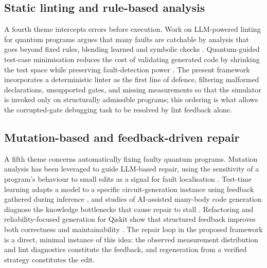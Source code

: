 \documentclass[11pt,a4paper]{article}
\begin{document}
\subsection{Static linting and rule-based analysis}
A fourth theme intercepts errors before execution. Work on LLM-powered linting for quantum programs argues that many faults are catchable by analysis that goes beyond fixed rules, blending learned and symbolic checks \cite{ref7}. Quantum-guided test-case minimisation reduces the cost of validating generated code by shrinking the test space while preserving fault-detection power \cite{ref17}. The present framework incorporates a deterministic linter as the first line of defence, filtering malformed declarations, unsupported gates, and missing measurements so that the simulator is invoked only on structurally admissible programs; this ordering is what allows the corrupted-gate debugging task to be resolved by lint feedback alone.

\subsection{Mutation-based and feedback-driven repair}
A fifth theme concerns automatically fixing faulty quantum programs. Mutation analysis has been leveraged to guide LLM-based repair, using the sensitivity of a program's behaviour to small edits as a signal for fault localisation \cite{ref14}. Test-time learning adapts a model to a specific circuit-generation instance using feedback gathered during inference \cite{ref13}, and studies of AI-assisted many-body code generation diagnose the knowledge bottlenecks that cause repair to stall \cite{ref9}. Refactoring and reliability-focused generation for Qiskit show that structured feedback improves both correctness and maintainability \cite{ref29,ref31}. The repair loop in the proposed framework is a direct, minimal instance of this idea: the observed measurement distribution and lint diagnostics constitute the feedback, and regeneration from a verified strategy constitutes the edit.
\end{document}
